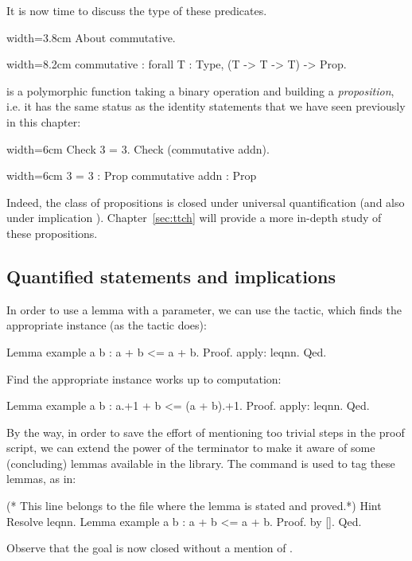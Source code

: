 It is now time to discuss the type of these predicates.

\begin{coq}{}{width=3.8cm}
About commutative.
\end{coq}
\begin{coqout}{}{width=8.2cm}
commutative : forall T : Type, (T -> T -> T) -> Prop.
\end{coqout}
 is a polymorphic function taking a binary operation and
building a \emph{proposition}, i.e. it has the same status as the
identity statements that we have seen previously in this chapter:

\begin{coq}{}{width=6cm}
Check 3 = 3.
Check (commutative addn).
\end{coq}
\begin{coqout}{}{width=6cm}
3 = 3 : Prop
commutative addn : Prop
\end{coqout}
Indeed, the class of propositions is closed under universal quantification
 (and also under implication \C{->}). Chapter~\ref{sec:ttch} will
provide a more in-depth study of these propositions.

\subsection{Quantified statements and implications}
\label{sec:quantifiedst}

In order to use a lemma with a parameter, we can use the 
tactic, which finds the appropriate instance (as the 
tactic does):

\begin{coq}{}{}
Lemma example a b : a + b <= a + b.
Proof. apply: leqnn. Qed.
\end{coq}
Find the appropriate instance works up to computation:

\begin{coq}{}{}
Lemma example a b : a.+1 + b <= (a + b).+1.
Proof. apply: leqnn. Qed.
\end{coq}
By the way, in order to save the effort of mentioning too trivial
steps in the proof script, we can extend the power of the 
terminator to make it aware of some (concluding) lemmas available in
the library. The  command is used to tag these lemmas,
as in:

\begin{coq}{}{}
(* This line belongs to the file where the lemma is stated and proved.*)
Hint Resolve leqnn.
Lemma example a b : a + b <= a + b.
Proof.  by [].  Qed.
\end{coq}
Observe that the goal is now closed without a mention of .

